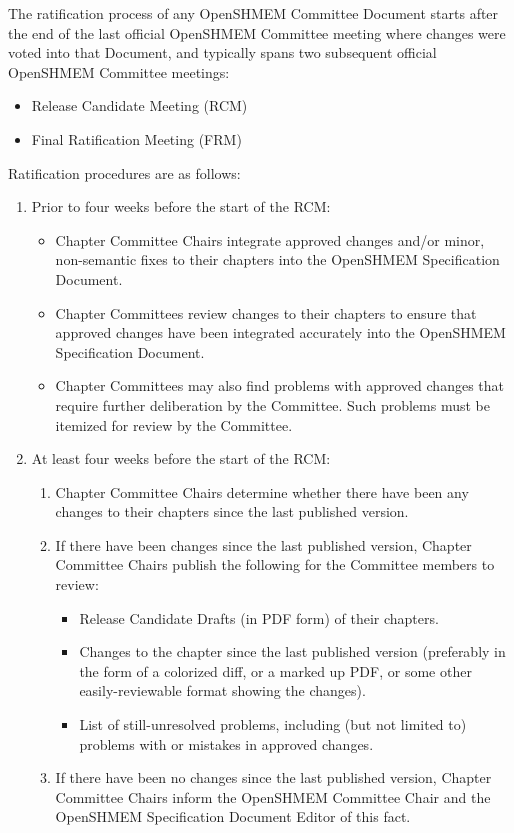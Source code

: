 The ratification process of any OpenSHMEM Committee Document starts after the
end of the last official OpenSHMEM Committee meeting where changes were voted
into that Document, and typically spans two subsequent official OpenSHMEM
Committee meetings:

\begin{itemize}
\item Release Candidate Meeting (RCM)
\item Final Ratification Meeting (FRM)
\end{itemize}

Ratification procedures are as follows:

\begin{enumerate}
\item Prior to four weeks before the start of the RCM:
  \begin{itemize}
  \item Chapter Committee Chairs integrate approved changes and/or
    minor, non-semantic fixes to their chapters into the OpenSHMEM Specification
    Document.
  \item Chapter Committees review changes to their chapters to ensure
    that approved changes have been integrated accurately into the OpenSHMEM
    Specification Document.
  \item Chapter Committees may also find problems with approved
    changes that require further deliberation by the Committee.  Such
    problems must be itemized for review by the Committee.
  \end{itemize}

\item At least four weeks before the start of the RCM:
  \begin{enumerate}
  \item Chapter Committee Chairs determine whether there have been
    any changes to their chapters since the last published version.
  \item If there have been changes since the last published version,
    Chapter Committee Chairs publish the following for the Committee
    members to review:
    \begin{itemize}
      \item Release Candidate Drafts (in PDF form) of their chapters.
      \item Changes to the chapter since the last published version
        (preferably in the form of a colorized diff, or a marked up
        PDF, or some other easily-reviewable format showing the
        changes).
      \item List of still-unresolved problems, including (but not
        limited to) problems with or mistakes in approved changes.
    \end{itemize}
  \item If there have been no changes since the last
    published version, Chapter Committee Chairs inform the OpenSHMEM Committee
    Chair and the OpenSHMEM Specification Document Editor of this fact.
  \end{enumerate}


\end{enumerate}
